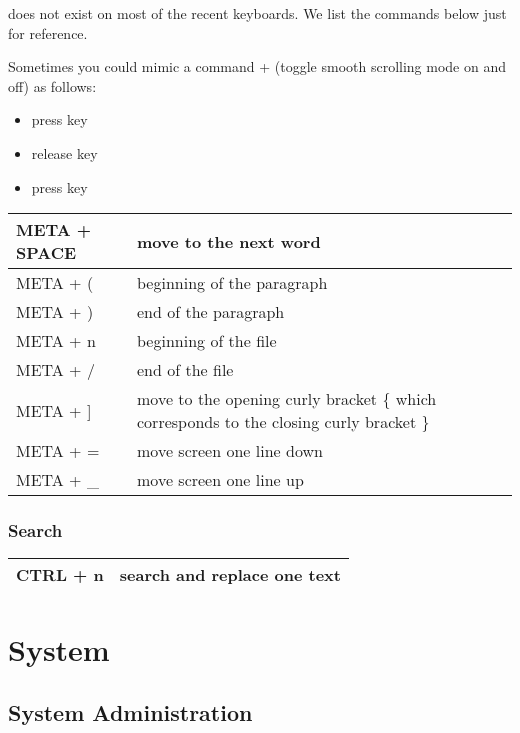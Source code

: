 \documentclass[letterpaper,10pt,english]{sphinxmanual}
\begin{document}
 does not exist on most of the recent keyboards. We list the commands below just for reference.

Sometimes you could mimic a command  +  (toggle smooth scrolling mode on and off) as follows:
\begin{itemize}
\item {} 
press  key

\item {} 
release  key

\item {} 
press  key

\end{itemize}

\begin{tabulary}{\linewidth}{|L|L|}
\hline

META + SPACE
 & 
move to the next word
\\
\hline
META + (
 & 
beginning of the paragraph
\\
\hline
META + )
 & 
end of the paragraph
\\
\hline
META + n
 & 
beginning of the file
\\
\hline
META + /
 & 
end of the file
\\
\hline
META + {]}
 & 
move to the opening curly bracket \{ which corresponds to the closing curly bracket \}
\\
\hline
META + =
 & 
move screen one line down
\\
\hline
META + \_
 & 
move screen one line up
\\
\hline\end{tabulary}



\subsection{Search}
\label{editor/nano:search}
\begin{tabulary}{\linewidth}{|L|L|}
\hline

CTRL + n
 & 
search and replace one text
\\
\hline\end{tabulary}



\chapter{System}
\label{index:system}

\section{System Administration}
\label{system/linux/admin:system-administration}\label{system/linux/admin::doc}
\end{document}

